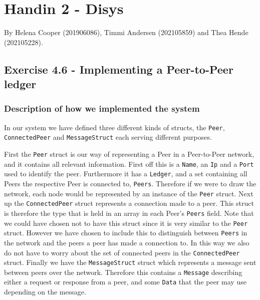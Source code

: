 \documentclass[
  paper=a4,
  ,captions=tableheading
]{scrartcl}
\newcommand{\passthrough}[1]{#1}
\begin{document}



\hypertarget{handin-2---disys}{%
\section{Handin 2 - Disys}\label{handin-2---disys}}

By Helena Cooper (201906086), Timmi Andersen (202105859) and Thea Hende
(202105228).

\hypertarget{exercise-4.6---implementing-a-peer-to-peer-ledger}{%
\subsection{Exercise 4.6 - Implementing a Peer-to-Peer
ledger}\label{exercise-4.6---implementing-a-peer-to-peer-ledger}}

\hypertarget{description-of-how-we-implemented-the-system}{%
\subsubsection{\texorpdfstring{\textbf{Description of how we implemented
the
system}}{Description of how we implemented the system}}\label{description-of-how-we-implemented-the-system}}

In our system we have defined three different kinds of structs, the
\passthrough{\lstinline!Peer!}, \passthrough{\lstinline!ConnectedPeer!}
and \passthrough{\lstinline!MessageStruct!} each serving different
purposes.

First the \passthrough{\lstinline!Peer!} struct is our way of
representing a Peer in a Peer-to-Peer network, and it contains all
relevant information. First off this is a
\passthrough{\lstinline!Name!}, an \passthrough{\lstinline!Ip!} and a
\passthrough{\lstinline!Port!} used to identify the peer. Furthermore it
has a \passthrough{\lstinline!Ledger!}, and a set containing all Peers
the respective Peer is connected to, \passthrough{\lstinline!Peers!}.
Therefore if we were to draw the network, each node would be represented
by an instance of the \passthrough{\lstinline!Peer!} struct. Next up the
\passthrough{\lstinline!ConnectedPeer!} struct represents a connection
made to a peer. This struct is therefore the type that is held in an
array in each Peer's \passthrough{\lstinline!Peers!} field. Note that we
could have chosen not to have this struct since it is very similar to
the \passthrough{\lstinline!Peer!} struct. However we have chosen to
include this to distinguish between \passthrough{\lstinline!Peers!} in
the network and the peers a peer has made a connection to. In this way
we also do not have to worry about the set of connected peers in the
\passthrough{\lstinline!ConnectedPeer!} struct. Finally we have the
\passthrough{\lstinline!MessageStruct!} struct which represents a
message sent between peers over the network. Therefore this contains a
\passthrough{\lstinline!Message!} describing either a request or
response from a peer, and some \passthrough{\lstinline!Data!} that the
peer may use depending on the message.
\end{document}
